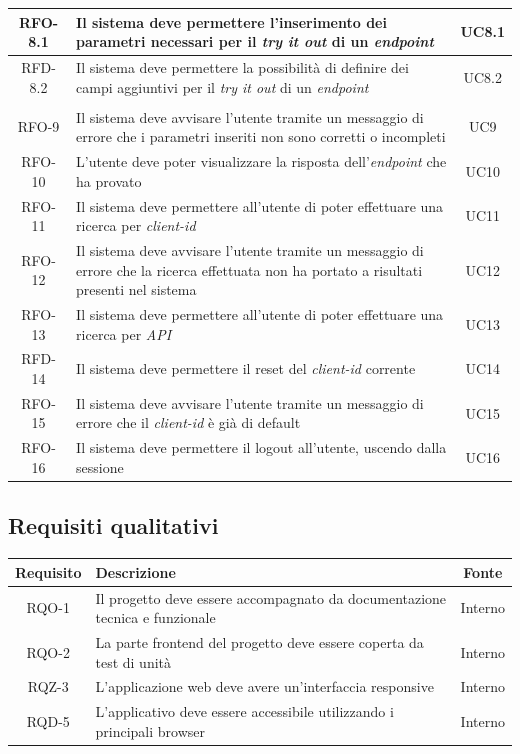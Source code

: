 \begin{center}
\begin{longtable}{|c|p{}|c|}
\hline
RFO-8.1 &Il sistema deve permettere l'inserimento dei parametri necessari per il \textit{try it out} di un \textit{endpoint} & UC8.1 \\
\hline
RFD-8.2 &Il sistema deve permettere la possibilità di definire dei campi aggiuntivi per il \textit{try it out} di un \textit{endpoint} & UC8.2 \\
\hline\pagebreak\hline
\multicolumn{3}{|c|}{\textbf{Continuazione della tabella~\ref{tab:requisiti-funzionali}}} \\
\hline
RFO-9 &Il sistema deve avvisare l'utente tramite un messaggio di errore che i parametri inseriti non sono corretti o incompleti & UC9 \\
\hline
RFO-10 &L'utente deve poter visualizzare la risposta dell'\textit{endpoint} che ha provato & UC10 \\
\hline
RFO-11 &Il sistema deve permettere all'utente di poter effettuare una ricerca per \textit{client-id} & UC11 \\
\hline
RFO-12 &Il sistema deve avvisare l'utente tramite un messaggio di errore che la ricerca effettuata non ha portato a risultati presenti nel sistema & UC12 \\
\hline
RFO-13 &Il sistema deve permettere all'utente di poter effettuare una ricerca per \textit{API} & UC13 \\
\hline
RFD-14 &Il sistema deve permettere il reset del \textit{client-id} corrente & UC14 \\
\hline
RFO-15 &Il sistema deve avvisare l'utente tramite un messaggio di errore che il \textit{client-id} è già di default & UC15 \\
\hline
RFO-16 &Il sistema deve permettere il logout all'utente, u\-scen\-do dalla sessione  & UC16 \\
\hline
\end{longtable}
\end{center}

\subsection{Requisiti qualitativi}\label{subsec:requisiti-qualitativi}

\begin{center}
\label{tab:requisiti-qualitativi}
\begin{longtable}{|c|p{}|c|}
\hline
\textbf{Requisito} & \textbf{Descrizione} & \textbf{Fonte}\\
\hline
RQO-1 &Il progetto deve essere accompagnato da documentazione tecnica e funzionale & Interno \\
\hline
RQO-2 &La parte frontend del progetto deve essere coperta da test di unità & Interno \\
\hline
RQZ-3 &L'applicazione web deve avere un'interfaccia responsive & Interno \\
\hline
RQD-5 &L'applicativo deve essere accessibile utilizzando i principali browser & Interno \\
\hline
\end{longtable}
\end{center}

